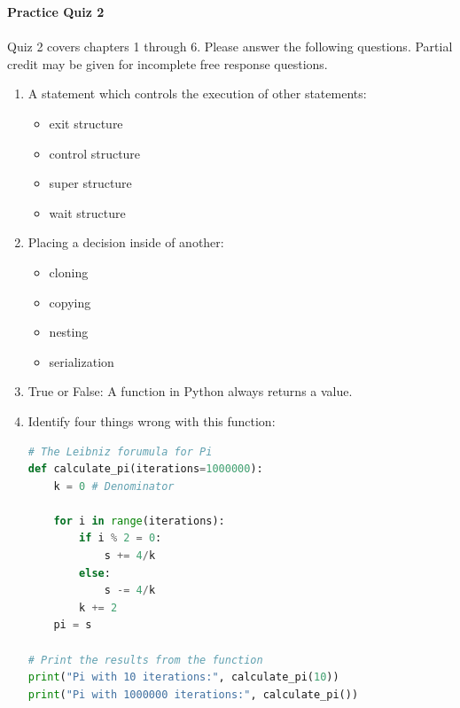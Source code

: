 \documentclass[letter,10pt]{article}
\begin{document}
\huge
\textbf{Practice Quiz 2}
\normalsize

\paragraph{}Quiz 2 covers chapters 1 through 6. Please answer the following questions. Partial credit may be given for incomplete free response questions.

\begin{enumerate}
    \item A statement which controls the execution of other statements:
    \begin{itemize}
        \item exit structure
        \item control structure
        \item super structure
        \item wait structure
    \end{itemize}

    \item Placing a decision inside of another:
    \begin{itemize}
        \item cloning
        \item copying
        \item nesting
        \item serialization
    \end{itemize}

    \item True or False: A function in Python always returns a value.

    \item Identify four things wrong with this function:
    \begin{lstlisting}[language=python]
# The Leibniz forumula for Pi
def calculate_pi(iterations=1000000):
    k = 0 # Denominator

    for i in range(iterations):
        if i % 2 = 0:
            s += 4/k
        else:
            s -= 4/k
        k += 2
    pi = s

# Print the results from the function
print("Pi with 10 iterations:", calculate_pi(10))
print("Pi with 1000000 iterations:", calculate_pi())
    \end{lstlisting}


\end{enumerate}
\end{document}
